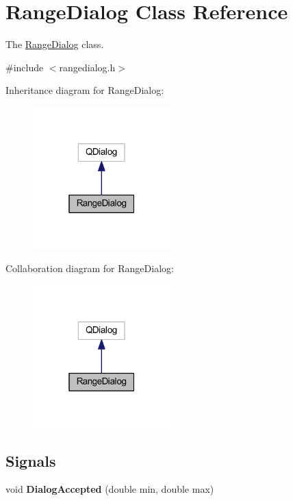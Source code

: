 \hypertarget{class_range_dialog}{\section{Range\+Dialog Class Reference}
\label{class_range_dialog}
}


The \hyperlink{class_range_dialog}{Range\+Dialog} class.  




{\ttfamily \#include $<$rangedialog.\+h$>$}



Inheritance diagram for Range\+Dialog\+:\nopagebreak
\begin{figure}[H]
\begin{center}
\leavevmode
\includegraphics[width=151pt]{class_range_dialog__inherit__graph}
\end{center}
\end{figure}


Collaboration diagram for Range\+Dialog\+:\nopagebreak
\begin{figure}[H]
\begin{center}
\leavevmode
\includegraphics[width=151pt]{class_range_dialog__coll__graph}
\end{center}
\end{figure}
\subsection*{Signals}
\begin{DoxyCompactItemize}
\item 
\hypertarget{class_range_dialog_aeaebb5984999d8a4b13497b6f0bdc390}{void {\bfseries Dialog\+Accepted} (double min, double max)}\label{class_range_dialog_aeaebb5984999d8a4b13497b6f0bdc390}

\end{DoxyCompactItemize}
